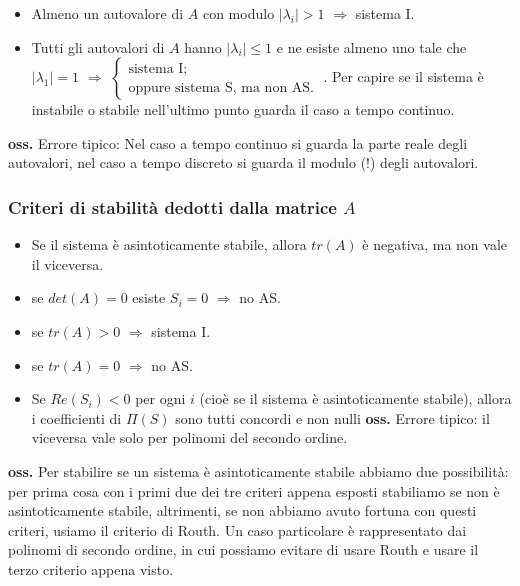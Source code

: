 \begin{landscape}
\begin{multicols*}{3}
\begin{itemize}
        \item Almeno un autovalore di $A$ con modulo $|\lambda_i| > 1$ $\Longrightarrow$ sistema I.
        \item Tutti gli autovalori di $A$ hanno $|\lambda_i| \leq 1$ e ne esiste almeno uno tale che $|\lambda_1| = 1$ $\Longrightarrow$ $\begin{cases}
            \text{sistema I;}\;\\
            \text{oppure sistema S, ma non AS.}\;
        \end{cases}$. \newline
        Per capire se il sistema è instabile o stabile nell'ultimo punto guarda il caso a tempo continuo.
    \end{itemize}
    \textbf{oss.} Errore tipico: Nel caso a tempo continuo si guarda la parte reale degli autovalori, nel caso a tempo discreto si guarda il modulo (!) degli autovalori.
    \subsubsection*{Criteri di stabilità dedotti dalla matrice $A$}
    \begin{itemize}
        \item Se il sistema è asintoticamente stabile, allora $tr(A)$ è negativa, ma non vale il viceversa.
        \item se $det(A) = 0$ esiste $S_i = 0$ $\Longrightarrow$ no AS.
        \item se $tr(A) >0$ $\Longrightarrow$ sistema I.
        \item se $tr(A) = 0$ $\Longrightarrow$ no AS.
        \item Se $Re(S_i)<0$ per ogni $i$ (cioè se il sistema è asintoticamente stabile), allora i coefficienti di $\Pi(S)$ sono tutti concordi e non nulli \newline
        \textbf{oss.} Errore tipico: il viceversa vale solo per polinomi del secondo ordine.
    \end{itemize}
    \textbf{oss.} Per stabilire se un sistema è asintoticamente stabile abbiamo due possibilità: per prima cosa con i primi due dei tre criteri appena esposti stabiliamo se non è asintoticamente stabile, altrimenti, se non abbiamo avuto fortuna con questi criteri, usiamo il criterio di Routh. Un caso particolare è rappresentato dai polinomi di secondo ordine, in cui possiamo evitare di usare Routh e usare il terzo criterio appena visto.

\end{multicols*}
\end{landscape}
